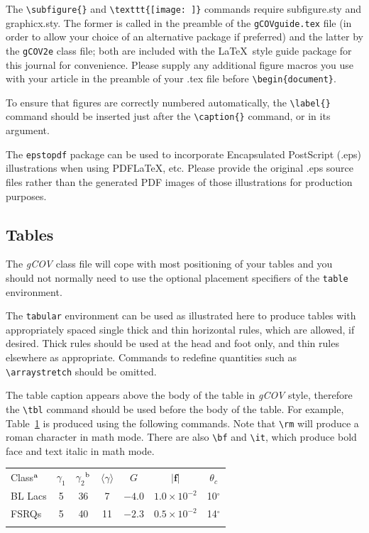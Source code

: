 \documentclass{gCOV2e}
\theoremstyle{plain}%
\theoremstyle{definition}
\theoremstyle{remark}
\begin{document}
The \verb"\subfigure{}" and \verb"\texttt{[image: ]}" commands require subfigure.sty and graphicx.sty.
The former is called in the preamble of the \texttt{gCOVguide.tex} file (in order to allow your choice of an alternative package if preferred)
and the latter by the \texttt{gCOV2e} class file; both are included with the \LaTeX\ style guide package for this journal for convenience.
Please supply any additional figure macros you use with your article in the preamble of your .tex file before \verb"\begin{document}".

To ensure that figures are correctly numbered automatically, the \verb"\label{}" command should be inserted just
after the \verb"\caption{}" command, or in its argument.

The \texttt{epstopdf} package can be used to incorporate Encapsulated PostScript (.eps) illustrations when using PDF\LaTeX, etc.
Please provide the original .eps source files rather than the generated PDF images of those illustrations for production purposes.


\subsection{Tables}

The \textit{gCOV} class file will cope with most positioning of your tables and you should not normally need to use the optional
placement specifiers of the \texttt{table} environment.

The \texttt{tabular} environment can be used as illustrated here to produce tables with appropriately spaced single thick and thin
horizontal rules, which are allowed, if desired. Thick rules should be used at the head and foot only, and thin rules elsewhere as appropriate.
Commands to redefine quantities such as \verb"\arraystretch" should be omitted.

The table caption appears above the body of the table in \textit{gCOV} style, therefore the \verb"\tbl" command should be used before the body of the table.
For example, Table~\ref{sample-table} is produced using the following commands. Note that \verb"\rm" will produce a roman character in math mode.
There are also \verb"\bf" and \verb"\it", which produce bold face and text italic in math mode.

\begin{table}
{\begin{tabular}[l]{@{}lcccccc}\toprule
  Class$^{\rm a}$ & $\gamma _1$ & $\gamma _2$$^{\rm b}$
         & $\langle \gamma \rangle$
         & $G$ & $|{\bm f}|$ & $\theta _{c}$ \\
\colrule
  BL Lacs & 5 & 36 & 7 & $-4.0$ & $1.0\times 10^{-2}$ & 10$^\circ$ \\
  FSRQs & 5 & 40 & 11 & $-2.3$ & $0.5\times 10^{-2}$ & 14$^\circ$ \\
\botrule
\end{tabular}}
\label{sample-table}
\end{table}
\end{document}

